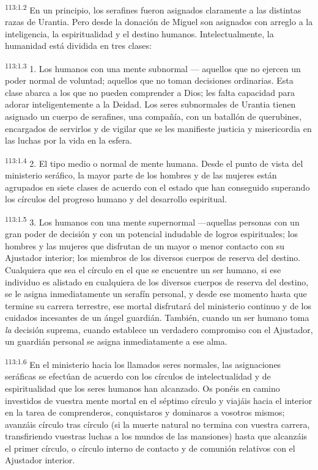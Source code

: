 \par
\textsuperscript{113:1.2} En un principio, los serafines fueron asignados claramente a las distintas razas de Urantia. Pero desde la donación de Miguel son asignados con arreglo a la inteligencia, la espiritualidad y el destino humanos. Intelectualmente, la humanidad está dividida en tres clases:

\par
\textsuperscript{113:1.3} 1. Los humanos con una mente subnormal --- aquellos que no ejercen un poder normal de voluntad; aquellos que no toman decisiones ordinarias. Esta clase abarca a los que no pueden comprender a Dios; les falta capacidad para adorar inteligentemente a la Deidad. Los seres subnormales de Urantia tienen asignado un cuerpo de serafines, una compañía, con un batallón de querubines, encargados de servirlos y de vigilar que se les manifieste justicia y misericordia en las luchas por la vida en la esfera.

\par
\textsuperscript{113:1.4} 2. El tipo medio o normal de mente humana. Desde el punto de vista del ministerio seráfico, la mayor parte de los hombres y de las mujeres están agrupados en siete clases de acuerdo con el estado que han conseguido superando los círculos del progreso humano y del desarrollo espiritual.

\par
\textsuperscript{113:1.5} 3. Los humanos con una mente supernormal ---aquellas personas con un gran poder de decisión y con un potencial indudable de logros espirituales; los hombres y las mujeres que disfrutan de un mayor o menor contacto con su Ajustador interior; los miembros de los diversos cuerpos de reserva del destino. Cualquiera que sea el círculo en el que se encuentre un ser humano, si ese individuo es alistado en cualquiera de los diversos cuerpos de reserva del destino, se le asigna inmediatamente un serafín personal, y desde ese momento hasta que termine su carrera terrestre, ese mortal disfrutará del ministerio continuo y de los cuidados incesantes de un ángel guardián. También, cuando un ser humano toma \textit{la} decisión suprema, cuando establece un verdadero compromiso con el Ajustador, un guardián personal se asigna inmediatamente a ese alma.

\par
\textsuperscript{113:1.6} En el ministerio hacia los llamados seres normales, las asignaciones seráficas se efectúan de acuerdo con los círculos de intelectualidad y de espiritualidad que los seres humanos han alcanzado. Os ponéis en camino investidos de vuestra mente mortal en el séptimo círculo y viajáis hacia el interior en la tarea de comprenderos, conquistaros y dominaros a vosotros mismos; avanzáis círculo tras círculo (si la muerte natural no termina con vuestra carrera, transfiriendo vuestras luchas a los mundos de las mansiones) hasta que alcanzáis el primer círculo, o círculo interno de contacto y de comunión relativos con el Ajustador interior.


